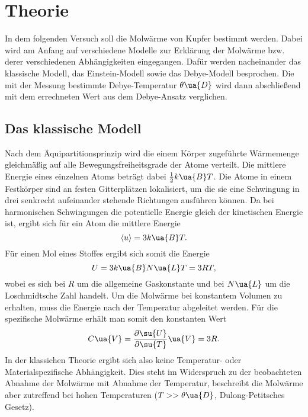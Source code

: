 \section{Theorie}

In dem folgenden Versuch soll die Molwärme von Kupfer bestimmt werden. Dabei wird
am Anfang auf verschiedene Modelle zur Erklärung der Molwärme bzw. derer verschiedenen
Abhängigkeiten eingegangen. Dafür werden nacheinander das klassische Modell, das Einstein-Modell
sowie das Debye-Modell besprochen. Die mit der Messung bestimmte Debye-Temperatur
$\theta\ua{D}$ wird dann abschließend mit dem errechneten Wert aus dem Debye-Ansatz
verglichen.

\subsection{Das klassische Modell}

Nach dem Äquipartitionsprinzip wird die einem Körper zugeführte Wärmemenge
gleichmäßig auf alle Bewegungsfreiheitsgrade der Atome verteilt. Die mittlere
Energie eines einzelnen Atoms beträgt dabei $\frac{1}{2}k\ua{B}T$. Die Atome in
einem Festkörper sind an festen Gitterplätzen lokalisiert, um die sie eine Schwingung
in drei senkrecht aufeinander stehende Richtungen ausführen können. Da bei harmonischen
Schwingungen die potentielle Energie gleich der kinetischen Energie ist, ergibt
sich für ein Atom die mittlere Energie
\begin{equation}
  \langle u \rangle = 3 k\ua{B} T.
\end{equation}
Für einen Mol eines Stoffes ergibt sich somit die Energie
\begin{equation}
  U = 3 k\ua{B} N\ua{L} T = 3 RT,
\end{equation}
wobei es sich bei $R$ um die allgemeine Gaskonstante und bei $N\ua{L}$ um die
Loschmidtsche Zahl handelt. Um die Molwärme bei konstantem Volumen zu erhalten,
muss die Energie nach der Temperatur abgeleitet werden. Für die spezifische Molwärme
erhält man somit den konstanten Wert
\begin{equation}
  C\ua{V} = \frac{\partial \su{U}}{\partial \su{T}}\ua{V} = 3R.
  \label{eqn:CVKlassisch}
\end{equation}
In der klassichen Theorie ergibt sich also keine Temperatur- oder Materialspezifische
Abhängigkeit. Dies steht im Widerspruch zu der beobachteten Abnahme der Molwärme
mit Abnahme der Temperatur, beschreibt die Molwärme aber zutreffend bei hohen Temperaturen
($T >> \theta\ua{D}$, Dulong-Petitsches Gesetz).

